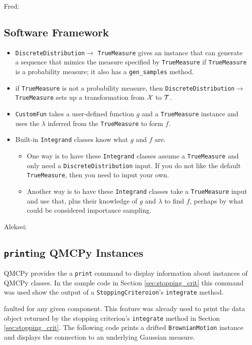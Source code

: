 \documentclass[graybox,footinfo]{svmult}
\newcommand{\AGSComment}[1]{{\color{cyan} Aleksei: #1}}
\newcommand{\FJHComment}[1]{{\color{magenta} Fred: #1}}
\begin{document}
\FJHComment{

\subsection{Software Framework}

\newcommand{\dd}{\texttt{DiscreteDistribution}\xspace}
\newcommand{\tm}{\texttt{TrueMeasure}\xspace}

\begin{itemize}
\item \dd $\rightarrow$ \tm gives an instance that can generate a sequence that mimics the measure specified by \tm if \tm is a probability measure; it also has a \texttt{gen\_samples} method.

\item if \tm is not a probability measure, then \dd $\rightarrow$ \tm sets up a transformation from ${\mathcal{X}}$ to ${\mathcal{T}}$.

\item \texttt{CustomFun} takes a user-defined function $g$ and a \tm instance and uses the $\lambda$ inferred from the \tm to form $f$.

\item Built-in \texttt{Integrand} classes know what $g$ and $f$ are.

\begin{itemize}
    \item One way is to have these \texttt{Integrand} classes assume a \tm and only need a \dd input. If you do not like the default \tm, then you need to input your own.
    
    \item Another way is to have these \texttt{Integrand} classes take a \tm input and use that, plus their knowledge of $g$ and $\lambda$ to find $f$, perhaps by what could be considered importance sampling.
    
\end{itemize}
\end{itemize}
}

\AGSComment{
\subsection{\texttt{print}ing  QMCPy Instances}

QMCPy provides the a \texttt{print} command to display information about instances of QMCPy classes. In the sample code in Section \ref{sec:stopping_crit} this command was used show the output of a \texttt{StoppingCriteroion}'s \texttt{integrate} method.

faulted for any given component. This feature was already used to print the data object returned by the stopping criterion's \texttt{integrate} method in Section \ref{sec:stopping_crit}. The following code prints a drifted \texttt{BrownianMotion} instance and displays the connection to an underlying Gaussian measure. 
}


\fi 
\end{document}
